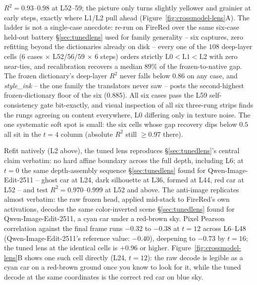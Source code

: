 \documentclass[10pt,twocolumn,letterpaper]{article}
\newcommand{\model}{Qwen-Image-Edit-2511}
\begin{document}
$R^2 = 0.93$--$0.98$ at L52--59; the picture only turns slightly
yellower and grainier at early steps, exactly where L1/L2 pull ahead
(Figure~\ref{fig:crossmodel-lens}A). The ladder is not a single-case
anecdote: re-run on FireRed over the same six-case held-out battery
\S\ref{sec:tunedlens} used for family generality -- six captures,
zero refitting beyond the dictionaries already on disk -- every one
of the $108$ deep-layer cells ($6$ cases $\times$ L52/56/59
$\times$ $6$ steps) orders strictly
$\text{L0}<\text{L1}<\text{L2}$ with zero near-ties, and recalibration
recovers a median $89\%$ of the frozen-to-native gap. The frozen
dictionary's deep-layer $R^2$ never falls below $0.86$ on any case,
and \emph{style\_ink} -- the one family the translators never saw --
posts the second-highest frozen-dictionary floor of the six
($0.885$). All six cases pass the L59 self-consistency gate
bit-exactly, and visual inspection of all six three-rung strips
finds the rungs agreeing on content everywhere, L0 differing only in
texture noise. The one systematic soft spot is small: the six cells
whose gap recovery dips below $0.5$ all sit in the $t{=}4$ column
(absolute $R^2$ still ${\ge}0.97$ there).

Refit natively (L2 above), the tuned lens reproduces
\S\ref{sec:tunedlens}'s central claim verbatim: no hard affine
boundary across the full depth, including L6; at $t{=}0$ the same
depth-assembly sequence \S\ref{sec:tunedlens} found for \model{} --
ghost car at L24, dark silhouette at L36, formed at L44, red car at
L52 -- and test $R^2 = 0.970$--$0.999$ at L52 and above. The anti-image
replicates almost verbatim: the raw frozen head, applied mid-stack to
FireRed's own activations, decodes the same color-inverted scene
\S\ref{sec:tunedlens} found for \model{}, a cyan car under a
red-brown sky. Pixel Pearson correlation against the final frame runs
$-0.32$ to $-0.38$ at $t{=}12$ across L6--L48 (\model{}'s reference
value: $-0.40$), deepening to $-0.73$ by $t{=}16$; the tuned lens at
the identical cells is $+0.96$ or higher.
Figure~\ref{fig:crossmodel-lens}B shows one such cell directly (L24,
$t{=}12$): the raw decode is legible as a cyan car on a red-brown
ground once you know to look for it, while the tuned decode at the
same coordinates is the correct red car on blue sky.
\end{document}
